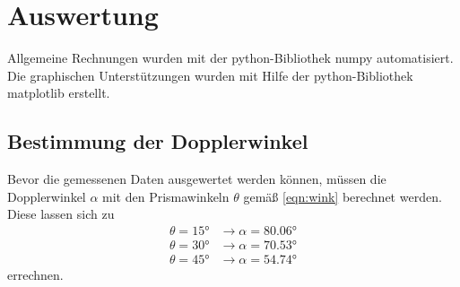 \section{Auswertung}
\label{sec:Auswertung}
Allgemeine Rechnungen wurden mit der python-Bibliothek numpy \cite{numpy} automatisiert.
Die graphischen Unterstützungen wurden mit Hilfe der python-Bibliothek matplotlib \cite{matplotlib}
erstellt.
\subsection{Bestimmung der Dopplerwinkel}
Bevor die gemessenen Daten ausgewertet werden können, müssen die Dopplerwinkel $\alpha$ mit den 
Prismawinkeln $\theta$ gemäß \eqref{eqn:wink} berechnet werden.
Diese lassen sich zu
\begin{align*}
    \theta = \ang{15;;} & \to \alpha = \ang{80.06;;} \\
    \theta = \ang{30;;} & \to \alpha = \ang{70.53;;} \\
    \theta = \ang{45;;} & \to \alpha = \ang{54.74;;}
\end{align*}
errechnen.

